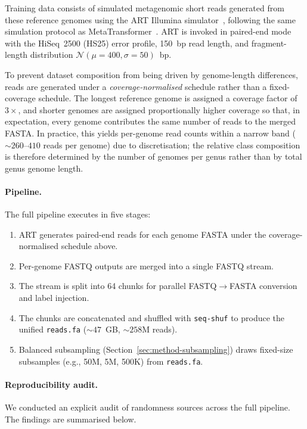 Training data consists of simulated metagenomic short reads generated from these reference genomes using the ART Illumina simulator~\cite{Huang2012}, following the same simulation protocol as MetaTransformer~\cite{Wichmann2023}.
ART is invoked in paired-end mode with the HiSeq~2500 (HS25) error profile, 150~bp read length, and fragment-length distribution $\mathcal{N}(\mu = 400, \sigma = 50)$~bp.

To prevent dataset composition from being driven by genome-length differences, reads are generated under a \emph{coverage-normalised} schedule rather than a fixed-coverage schedule.
The longest reference genome is assigned a coverage factor of $3\times$, and shorter genomes are assigned proportionally higher coverage so that, in expectation, every genome contributes the same number of reads to the merged FASTA.
In practice, this yields per-genome read counts within a narrow band ($\sim\!260$--$410$ reads per genome) due to discretisation; the relative class composition is therefore determined by the number of genomes per genus rather than by total genus genome length.

\paragraph{Pipeline.}
The full pipeline executes in five stages:
\begin{enumerate}
    \item ART generates paired-end reads for each genome FASTA under the coverage-normalised schedule above.
    \item Per-genome FASTQ outputs are merged into a single FASTQ stream.
    \item The stream is split into 64 chunks for parallel FASTQ$\to$FASTA conversion and label injection.
    \item The chunks are concatenated and shuffled with \texttt{seq-shuf} to produce the unified \texttt{reads.fa} ($\sim\!47$~GB, $\sim\!258$M reads).
    \item Balanced subsampling (Section~\ref{sec:method-subsampling}) draws fixed-size subsamples (e.g., 50M, 5M, 500K) from \texttt{reads.fa}.
\end{enumerate}

\paragraph{Reproducibility audit.}
We conducted an explicit audit of randomness sources across the full pipeline.
The findings are summarised below.

